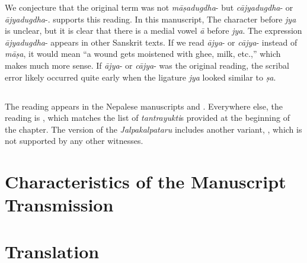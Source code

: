 We conjecture that the original term was not \emph{māṣadugdha}- 
but \emph{cājyadugdha}- or \emph{ājyadugdha}-. 
 supports this reading. 
In this manuscript, The character before \emph{jya} is unclear, 
but it is clear that there is a medial vowel \emph{ā} before \emph{jya}. 
The expression \emph{ājyadugdha}- appears in other Sanskrit texts. 
If we read \emph{ājya}- or \emph{cājya}- instead of \emph{māṣa}, 
it would mean “a wound gets moistened with ghee, milk, etc.,” 
which makes much more sense. 
If \emph{ājya}- or \emph{cājya}- was the original reading, 
the scribal error likely occurred quite early 
when the ligature \emph{jya} looked similar to \emph{ṣa}.

\subsection{}

The reading  appears in the Nepalese manuscripts 
and . 
Everywhere else, the reading is , which matches 
the list of \emph{tantrayukti}s provided at the beginning of the chapter. 
The version of the \emph{Jalpakalpataru} includes another variant, 
, which is not supported by any other witnesses.



\section{Characteristics of the Manuscript Transmission}


\newpage
\section{Translation}

